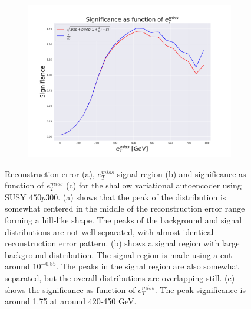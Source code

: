 \begin{figure}[h!]
    \hfill  
    \begin{subfigure}{.49\textwidth}
        \includegraphics[width=\textwidth]{Figures/VAE_testing/small/2lep/significance_etmiss_450p0p0300_-0.8484803499636524.pdf}
        \caption{}
        \label{fig:VAE_2lep_small_signi_450}
    \end{subfigure}
    \hfill      
    \caption[2lep shallow network | $450p300$ | VAE]{Reconstruction error (a), $e_T^{miss}$ signal region (b) and significance as function of 
    $e_T^{miss}$ (c) for the shallow variational autoencoder using SUSY $450p300$.
    (a) shows that the peak of the distribution is somewhat centered in the middle 
    of the reconstruction error range forming a hill-like shape. The peaks of the background and signal 
    distributions are not well separated, with almost identical reconstruction error pattern. (b) 
    shows a signal region with large background distribution. The signal region is made using a cut around
    $10^{-0.85}$. The peaks in the signal region are also somewhat 
    separated, but the overall distributions are overlapping still. 
    (c) shows the significance as function of $e_T^{miss}$. 
The peak significance is around 1.75 at around 420-450 GeV.}
    \label{fig:VAE_2lep_small_rec_sig_signi_450}
\end{figure}


